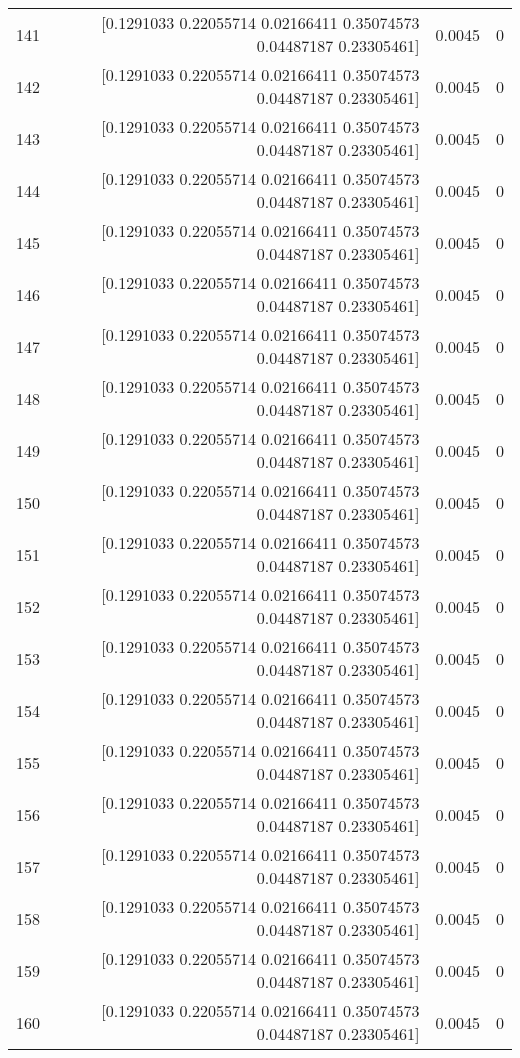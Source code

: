 \begin{longtable}{lrrr}
141 & [0.1291033  0.22055714 0.02166411 0.35074573 0.04487187 0.23305461] & 0.0045 & 0 \\
142 & [0.1291033  0.22055714 0.02166411 0.35074573 0.04487187 0.23305461] & 0.0045 & 0 \\
143 & [0.1291033  0.22055714 0.02166411 0.35074573 0.04487187 0.23305461] & 0.0045 & 0 \\
144 & [0.1291033  0.22055714 0.02166411 0.35074573 0.04487187 0.23305461] & 0.0045 & 0 \\
145 & [0.1291033  0.22055714 0.02166411 0.35074573 0.04487187 0.23305461] & 0.0045 & 0 \\
146 & [0.1291033  0.22055714 0.02166411 0.35074573 0.04487187 0.23305461] & 0.0045 & 0 \\
147 & [0.1291033  0.22055714 0.02166411 0.35074573 0.04487187 0.23305461] & 0.0045 & 0 \\
148 & [0.1291033  0.22055714 0.02166411 0.35074573 0.04487187 0.23305461] & 0.0045 & 0 \\
149 & [0.1291033  0.22055714 0.02166411 0.35074573 0.04487187 0.23305461] & 0.0045 & 0 \\
150 & [0.1291033  0.22055714 0.02166411 0.35074573 0.04487187 0.23305461] & 0.0045 & 0 \\
151 & [0.1291033  0.22055714 0.02166411 0.35074573 0.04487187 0.23305461] & 0.0045 & 0 \\
152 & [0.1291033  0.22055714 0.02166411 0.35074573 0.04487187 0.23305461] & 0.0045 & 0 \\
153 & [0.1291033  0.22055714 0.02166411 0.35074573 0.04487187 0.23305461] & 0.0045 & 0 \\
154 & [0.1291033  0.22055714 0.02166411 0.35074573 0.04487187 0.23305461] & 0.0045 & 0 \\
155 & [0.1291033  0.22055714 0.02166411 0.35074573 0.04487187 0.23305461] & 0.0045 & 0 \\
156 & [0.1291033  0.22055714 0.02166411 0.35074573 0.04487187 0.23305461] & 0.0045 & 0 \\
157 & [0.1291033  0.22055714 0.02166411 0.35074573 0.04487187 0.23305461] & 0.0045 & 0 \\
158 & [0.1291033  0.22055714 0.02166411 0.35074573 0.04487187 0.23305461] & 0.0045 & 0 \\
159 & [0.1291033  0.22055714 0.02166411 0.35074573 0.04487187 0.23305461] & 0.0045 & 0 \\
160 & [0.1291033  0.22055714 0.02166411 0.35074573 0.04487187 0.23305461] & 0.0045 & 0 \\

\end{longtable}
